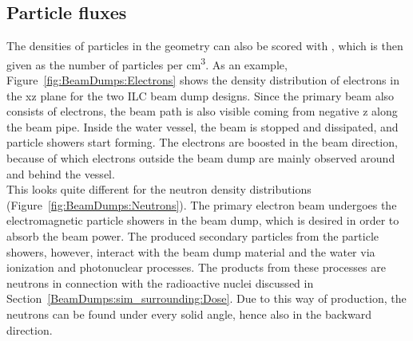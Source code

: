 \subsection{Particle fluxes}
\label{BeamDumps:sim_surrounding:Particle}  
 The densities of particles in the geometry can also be scored with \fluka, which is then given as the number of particles per \si{\centi\meter\cubed}.
 As an example, Figure~\ref{fig:BeamDumps:Electrons} shows the density distribution of electrons in the xz plane for the two ILC beam dump designs.
 Since the primary beam also consists of electrons, the beam path is also visible coming from negative z along the beam pipe.
 Inside the water vessel, the beam is stopped and dissipated, and particle showers start forming. The electrons are boosted in the beam direction, because of which electrons outside the beam dump are mainly observed around and behind the vessel. 
 \\This looks quite different for the neutron density distributions (Figure~\ref{fig:BeamDumps:Neutrons}).
 The primary electron beam undergoes the electromagnetic particle showers in the beam dump, which is desired in order to absorb the beam power.
 The produced secondary particles from the particle showers, however, interact with the beam dump material and the water via ionization and photonuclear processes.
 The products from these processes are neutrons in connection with the radioactive nuclei discussed in Section~\ref{BeamDumps:sim_surrounding:Dose}.
 Due to this way of production, the neutrons can be found under every solid angle, hence also in the backward direction. 
 
